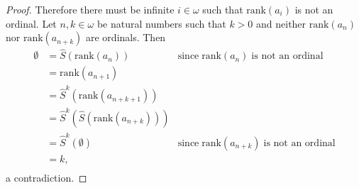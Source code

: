 \documentclass{article}
\begin{document}
\begin{proof}
    Therefore there must be infinite $i\in\omega$ such that
    $\text{rank}(a_i)$ is not an ordinal. Let $n,k\in\omega$ be natural
    numbers such that $k>0$ and neither $\text{rank}(a_n)$ nor
    $\text{rank}(a_{n+k})$ are ordinals. Then
    \begin{align*}
      \emptyset &=\hat{S}(\text{rank}(a_{n})) &\text{since}\;
        \text{rank}(a_n)\; \text{is not an ordinal}\\
      &=\text{rank}(a_{n+1})\\
      &=\hat{S}^{k}(\text{rank}(a_{n+k+1}))\\
      &=\hat{S}^{k}(\hat{S}(\text{rank}(a_{n+k})))\\
      &=\hat{S}^{k}(\emptyset) &\text{since}\; \text{rank}(a_{n+k})\;
        \text{is not an ordinal}\\
      &=k,\\
    \end{align*}
    a contradiction.




\end{proof}
\end{document}
